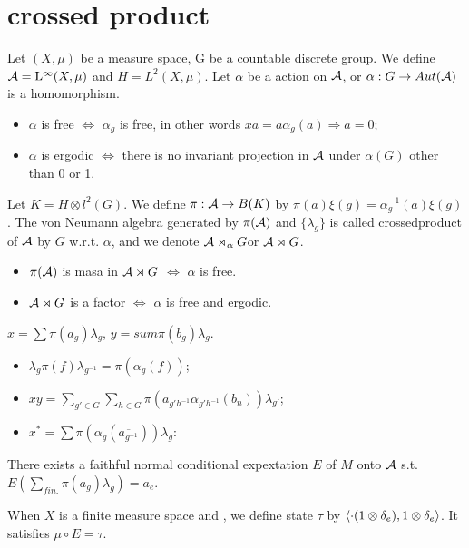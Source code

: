 \section{crossed product}

\begin{definition}
  Let $(X,\mu)$ be a measure space, G be a countable discrete group.
  We define $\mathcal{A} = {\rm L}^\infty(X,\mu)$ and $H = L^2(X,\mu)$.
  Let $\alpha$ be a action on $\mathcal{A}$, or $\alpha : G \rightarrow Aut(\mathcal{A})$ is a homomorphism. 
  \begin{itemize}
    \item $\alpha$ is free $\Leftrightarrow$ $\alpha_g$ is free, in other words $xa = a\alpha_g(a) \Rightarrow a=0$;
    \item $\alpha$ is ergodic $\Leftrightarrow$ there is no invariant projection in $\mathcal{A}$ under $\alpha(G)$ other than 0 or 1.
  \end{itemize}

  Let $K=H\otimes l^2(G)$.
  We define $\pi : \mathcal{A} \rightarrow B(K)$ by $\pi(a)\xi(g)=\alpha_g^{-1}(a)\xi(g)$.
  The von Neumann algebra generated by $\pi(\mathcal{A})$ and $\{\lambda_g\}$ is  called crossedproduct of $\mathcal{A}$ by $G$ w.r.t. $\alpha$, and we denote $\mathcal{A}\rtimes_\alpha G$or $\mathcal{A}\rtimes G$.
\end{definition}

\begin{theorem}
  \begin{itemize}
    \item $\pi(\mathcal{A})$ is masa in $\mathcal{A}\rtimes G$ $\Leftrightarrow$ $\alpha$ is free.
    \item $\mathcal{A}\rtimes G$ is a factor $\Leftrightarrow$ $\alpha$ is free and ergodic.
  \end{itemize}
\end{theorem}

\begin{proposition}
  $x = \sum \pi(a_g)\lambda_g$, $y = sum \pi(b_g)\lambda_g$.
  \begin{itemize}
    \item $\lambda_g \pi(f) \lambda_{g^{-1}} = \pi(\alpha_g(f))$;
    \item $xy = \sum_{g'\in G}\sum_{h\in G}\pi(a_{g'h^{-1}}\alpha_{g'h^{-1}}(b_n))\lambda_{g'}$;
    \item $x^*= \sum \pi (\alpha_{g}(\overline{a_{g^{-1}}}))\lambda_{g}$:
  \end{itemize}
\end{proposition}

\begin{proposition}
  There exists a faithful normal conditional expextation $E$ of $M$ onto $\mathcal{A}$ s.t. $E(\sum_{fin.}\pi(a_g)\lambda_g) = a_e$.
\end{proposition}


When $X$ is a finite measure space and , we define state $\tau$ by $\langle\cdot(1\otimes\delta_e),1 \otimes \delta_e\rangle$.
It satisfies $\mu \circ E = \tau$.



